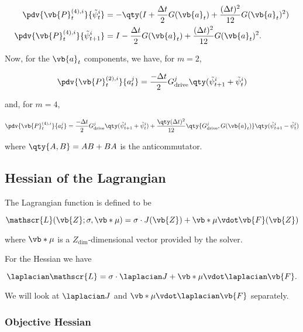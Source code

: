 \documentclass{article}
\newcommand{\isopsi}{\tilde \psi}
\begin{document}
\begin{align}
  \pdv{\vb{P}_t^{(4),i}}{\isopsi^i_t} &= -\qty(I + \frac{\Delta t}{2}G(\vb{a}_t) + \frac{(\Delta t)^2}{12} G(\vb{a}_t)^2) \\
  \pdv{\vb{P}_t^{(4),i}}{\isopsi^i_{t+1}} &= I - \frac{\Delta t}{2}G(\vb{a}_t) + \frac{(\Delta t)^2}{12} G(\vb{a}_t)^2.
\end{align}


Now, for the $\vb{a}_t$ components, we have, for $m = 2$,

\begin{equation}
  \pdv{\vb{P}_t^{(2),i}}{a^j_t} 
    = \frac{-\Delta t}{2} G^j_{\text{drive}} \qty(\isopsi^i_{t+1} + \isopsi^i_{t})
\end{equation}

and, for $m = 4$,

\begin{equation}
  \pdv{\vb{P}_t^{(4),i}}{a^j_t} 
    = \frac{-\Delta t}{2} G^j_{\text{drive}} \qty(\isopsi^i_{t+1} + \isopsi^i_{t}) + \frac{\qty(\Delta t)^2}{12} \qty{G^j_{\text{drive}}, G(\vb{a}_t)}\qty(\isopsi^i_{t+1} - \isopsi^i_{t})
\end{equation}

where $\qty{A, B} = AB + BA$ is the anticommutator. 


\newpage

\subsection{Hessian of the Lagrangian}

The Lagrangian function is defined to be

\begin{equation}
  \mathscr{L}(\vb{Z}; \sigma, \vb*{\mu}) = \sigma \cdot J(\vb{Z}) + \vb*{\mu} \vdot \vb{F}(\vb{Z})
\end{equation}

where $\vb*{\mu}$ is a $Z_{\dim}$-dimensional vector provided by the solver.

\hfill

For the Hessian we have 

\begin{equation}
  \laplacian \mathscr{L} = \sigma \cdot \laplacian J + \vb*{\mu} \vdot \laplacian \vb{F}.
\end{equation}

We will look at $\laplacian J$ and $\vb*{\mu} \vdot \laplacian \vb{F}$ separately.

\subsubsection*{Objective Hessian}
\end{document}
